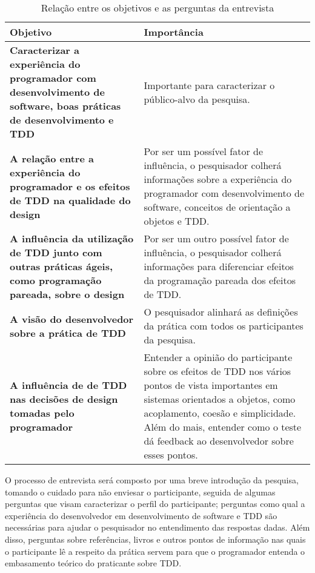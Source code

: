 \begin{table}[h!]
	\begin{tabular}{ | p{6cm} | p{7cm} | }
		Objetivo & Importância \\
		
		\hline
		\textbf{Caracterizar a experiência do programador com desenvolvimento de
		software, boas práticas de desenvolvimento e TDD} 
		&
		Importante para caracterizar o público-alvo da pesquisa.

		\\

		\hline
		\textbf{A relação entre a experiência do programador e os efeitos de TDD
		na qualidade do design} 
		&
		Por ser um possível fator de influência, o pesquisador colherá
		informações sobre a experiência do programador com desenvolvimento de software, 
		conceitos de orientação a objetos e TDD.

		\\

		\hline
		\textbf{A influência da utilização de TDD
	junto com outras práticas ágeis, como programação pareada, sobre o design} 
		&
		Por ser um outro possível fator de influência, o pesquisador colherá informações
		para diferenciar efeitos da programação pareada dos efeitos de TDD.

		\\

		\hline
		\textbf{A visão do desenvolvedor sobre a prática de TDD} 
		&
		O pesquisador alinhará as definições da prática com todos os participantes da
		pesquisa.

		\\

		\hline
		\textbf{A influência de de TDD nas decisões de design tomadas pelo programador} 
		&
		Entender a opinião do participante sobre os efeitos de TDD
		nos vários pontos de vista importantes em sistemas orientados a objetos, como
		acoplamento, coesão e simplicidade. Além do mais, entender como o teste
		dá feedback ao desenvolvedor sobre esses pontos.
		
		\\

		\hline												
	\end{tabular}
	\caption{Relação entre os objetivos e as perguntas da entrevista}
	\label{tab:questoes}
\end{table}

O processo de entrevista será composto por uma breve introdução da pesquisa, tomando
o cuidado para não enviesar o participante, seguida de algumas perguntas que visam
caracterizar o perfil do participante; perguntas como qual a experiência do
desenvolvedor em desenvolvimento de software e TDD são necessárias para ajudar o
pesquisador no entendimento das respostas dadas. Além disso, perguntas sobre
referências, livros e outros pontos de informação nas quais o participante lê a
respeito da prática servem para que o programador entenda o embasamento teórico
do praticante sobre TDD.

